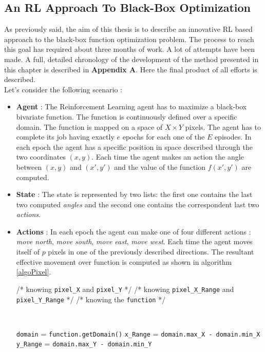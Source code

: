 \subsection{An RL Approach To Black-Box Optimization} As previously said, the aim of this thesis is to describe an innovative RL based approach to the black-box function optimization problem. The process to reach this goal has required about three months of work. A lot of attempts have been made. A full, detailed chronology of the development of the method presented in this chapter is described in \textbf{Appendix A}. Here the final product of all efforts is described. \\

Let's consider the following scenario :

\begin{itemize}
	
	\item \textbf{Agent} : The Reinforcement Learning agent has to maximize a black-box bivariate function. The function is continuously defined over a specific domain. The function is mapped on a space of $X \times Y$ pixels. The agent has to complete its job having exactly $e$ epochs for each one of the $E$ episodes. In each epoch the agent has a specific position in space described through the two coordinates $(x, y)$. Each time the agent makes an action the angle between $(x, y)$ and $(x', y')$ and the value of the function $f(x', y')$ are computed.
	
	\item \textbf{State} : The state is represented by two lists: the first one contains the last two computed \textit{angles} and the second one contains the correspondent last two \textit{actions}.
	
	\item \textbf{Actions} : In each epoch the agent can make one of four different actions : \textit{move north}, \textit{move  south}, \textit{move east}, \textit{move west}. Each time the agent moves itself of $p$ pixels in one of the previously described directions. The resultant effective movement over function is computed as shown in algorithm \ref{algoPixel}.
	
	\begin{algorithm} [h!]
		/* knowing {\tt pixel\_X} and {\tt pixel\_Y} */\;
		/* knowing {\tt pixel\_X\_Range} and {\tt pixel\_Y\_Range} */ \;
		/* knowing the {\tt function} */\;
		
		\
		
		{\tt domain} = {\tt function.getDomain()} \;
		{\tt x\_Range} = {\tt domain.max\_X - domain.min\_X} \;
		{\tt y\_Range} = {\tt domain.max\_Y - domain.min\_Y} \;
		

\end{algorithm}
\end{itemize}
